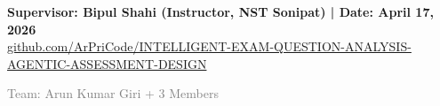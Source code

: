 \documentclass[12pt,a4paper]{article}
\begin{document}
\vspace{1.5em}

\begin{center}
\textbf{\textcolor{nstblue}{Supervisor: Bipul Shahi (Instructor, NST Sonipat) \quad | \quad Date: April 17, 2026}}\\[0.5em]
\textcolor{nstlightblue}{\url{github.com/ArPriCode/INTELLIGENT-EXAM-QUESTION-ANALYSIS-AGENTIC-ASSESSMENT-DESIGN}}
\end{center}

\vfill
\begin{center}
\small\textcolor{gray}{Team: Arun Kumar Giri + 3 Members}
\end{center}
\end{document}
